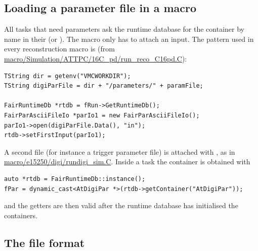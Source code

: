 \subsection{Loading a parameter file in a macro}

All tasks that need parameters ask the runtime database for the container by name in their
 (or ). The macro only has to attach an input. The pattern used in
every reconstruction macro is (from \url{macro/Simulation/ATTPC/16C_pd/run_reco_C16pd.C}):
\begin{verbatim}
TString dir = getenv("VMCWORKDIR");
TString digiParFile = dir + "/parameters/" + paramFile;

FairRuntimeDb *rtdb = fRun->GetRuntimeDb();
FairParAsciiFileIo *parIo1 = new FairParAsciiFileIo();
parIo1->open(digiParFile.Data(), "in");
rtdb->setFirstInput(parIo1);
\end{verbatim}
A second file (for instance a trigger parameter file) is attached with , as in
\url{macro/e15250/digi/rundigi_sim.C}. Inside a task the container is obtained with
\begin{verbatim}
auto *rtdb = FairRuntimeDb::instance();
fPar = dynamic_cast<AtDigiPar *>(rtdb->getContainer("AtDigiPar"));
\end{verbatim}
and the getters are then valid after the runtime database has initialised the containers.

\subsection{The  file format}

